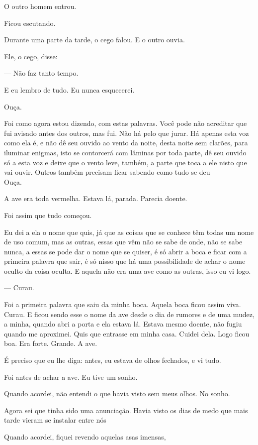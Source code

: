 O outro homem entrou.

Ficou escutando.

Durante uma parte da tarde, o cego falou. E o outro ouvia.

Ele, o cego, disse:

--- Não faz tanto tempo.

E eu lembro de tudo. Eu nunca esquecerei.

Ouça.

Foi como agora estou dizendo, com estas palavras. Você pode não
acreditar que fui avisado antes dos outros, mas fui. Não há pelo que
jurar. Há apenas esta voz como ela é, e não dê seu ouvido ao vento da
noite, desta noite sem clarões, para iluminar enigmas, isto se
contorcerá com lâminas por toda parte, dê seu ouvido só a esta voz e
deixe que o vento leve, também, a parte que toca a ele nisto que vai
ouvir. Outros também precisam ficar sabendo como tudo se deu\\

Ouça.

A ave era toda vermelha. Estava lá, parada. Parecia doente.

Foi assim que tudo começou.

Eu dei a ela o nome que quis, já que as coisas que se conhece têm todas
um nome de uso comum, mas as outras, essas que vêm não se sabe de onde,
não se sabe nunca, a essas se pode dar o nome que se quiser, é só abrir
a boca e ficar com a primeira palavra que sair, é só nisso que há uma
possibilidade de achar o nome oculto da coisa oculta. E aquela não era
uma ave como as outras, isso eu vi logo.

--- Curau.

Foi a primeira palavra que saiu da minha boca. Aquela boca ficou assim
viva. Curau. E ficou sendo esse o nome da ave desde o dia de rumores e
de uma mudez, a minha, quando abri a porta e ela estava lá. Estava mesmo
doente, não fugiu quando me aproximei. Quis que entrasse em minha casa.
Cuidei dela. Logo ficou boa. Era forte. Grande. A ave.

É preciso que eu lhe diga: antes, eu estava de olhos fechados, e vi
tudo.

Foi antes de achar a ave. Eu tive um sonho.

Quando acordei, não entendi o que havia visto sem meus olhos. No sonho.

Agora sei que tinha sido uma anunciação. Havia visto os dias de medo que
mais tarde vieram se instalar entre nós

Quando acordei, fiquei revendo aquelas asas imensas,

